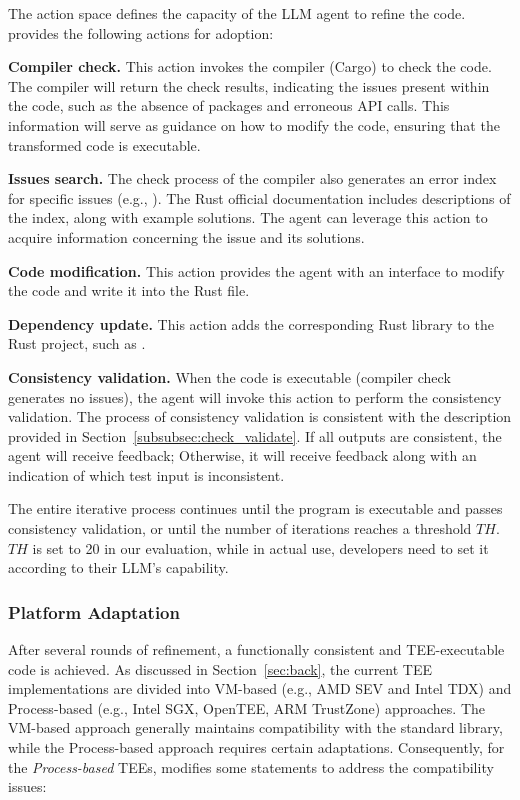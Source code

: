 The action space defines the capacity of the LLM agent to refine the code. 
\system provides the following actions for adoption:
\begin{description}[leftmargin=0pt]
    \item [Action 1:] \textbf{Compiler check.}
    This action invokes the compiler (Cargo) to check the code.
    The compiler will return the check results, indicating the issues present within the code, such as the absence of packages and erroneous API calls.
    This information will serve as guidance on how to modify the code, ensuring that the transformed code is executable.
    
    \item [Action 2:] \textbf{Issues search.} 
    The check process of the compiler also generates an error index for specific issues (e.g., ).
    The Rust official documentation includes descriptions of the index, along with example solutions.
    The agent can leverage this action to acquire information concerning the issue and its solutions.

    \item [Action 3:] \textbf{Code modification.}
    This action provides the agent with an interface to modify the code and write it into the Rust file.

    \item [Action 4:] \textbf{Dependency update.} 
    This action adds the corresponding Rust library to the Rust project, such as .

    \item [Action 5:] \textbf{Consistency validation.} 
    When the code is executable (compiler check generates no issues), the agent will invoke this action to perform the consistency validation.
    The process of consistency validation is consistent with the description provided in Section~\ref{subsubsec:check_validate}.
    If all outputs are consistent, the agent will receive  feedback; 
    Otherwise, it will receive  feedback along with an indication of which test input is inconsistent.
\end{description}

The entire iterative process continues until the program is executable and passes consistency validation, or until the number of iterations reaches a threshold $TH$.
$TH$ is set to 20 in our evaluation, while in actual use, developers need to set it according to their LLM's capability.

\subsubsection{Platform Adaptation}
After several rounds of refinement, a functionally consistent and TEE-executable code is achieved.
As discussed in Section~\ref{sec:back}, the current TEE implementations are divided into VM-based (e.g., AMD SEV and Intel TDX) and Process-based (e.g., Intel SGX, OpenTEE, ARM TrustZone) approaches. 
The VM-based approach generally maintains compatibility with the standard library, while the Process-based approach requires certain adaptations. 
Consequently, for the \emph{Process-based} TEEs, \system modifies some statements to address the compatibility issues:

